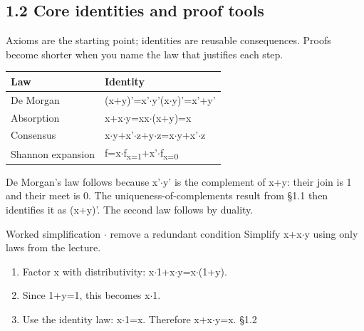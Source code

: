 \documentclass[11pt]{article}
\begin{document}
\begin{keepsection}
\section{1.2 Core identities and proof tools}

Axioms are the starting point; identities are reusable consequences. Proofs become shorter when you name the law that justifies each step.

\begin{center}\small\begin{tabularx}{\linewidth}{>{\raggedright\arraybackslash}X>{\raggedright\arraybackslash}X}\toprule
\textbf{Law} & \textbf{Identity} \\ \midrule
De Morgan & (x+y)'=x'\ensuremath{\cdot}y'(x\ensuremath{\cdot}y)'=x'+y' \\
Absorption & x+x\ensuremath{\cdot}y=xx\ensuremath{\cdot}(x+y)=x \\
Consensus & x\ensuremath{\cdot}y+x'\ensuremath{\cdot}z+y\ensuremath{\cdot}z=x\ensuremath{\cdot}y+x'\ensuremath{\cdot}z \\
Shannon expansion & f=x\ensuremath{\cdot}f\textsubscript{x=1}+x'\ensuremath{\cdot}f\textsubscript{x=0} \\
\bottomrule\end{tabularx}\end{center}

De Morgan’s law follows because x'\ensuremath{\cdot}y' is the complement of x+y: their join is 1 and their meet is 0. The uniqueness-of-complements result from §1.1 then identifies it as (x+y)'. The second law follows by duality.

\begin{workedbox}{Worked simplification \ensuremath{\cdot} remove a redundant condition}
Simplify x+x\ensuremath{\cdot}y using only laws from the lecture.

\begin{enumerate}
\item Factor x with distributivity: x\ensuremath{\cdot}1+x\ensuremath{\cdot}y=x\ensuremath{\cdot}(1+y).
\item Since 1+y=1, this becomes x\ensuremath{\cdot}1.
\item Use the identity law: x\ensuremath{\cdot}1=x. Therefore x+x\ensuremath{\cdot}y=x. \hfill{\small\color{FAUblue}§1.2}
\end{enumerate}


\end{workedbox}
\end{keepsection}
\end{document}
